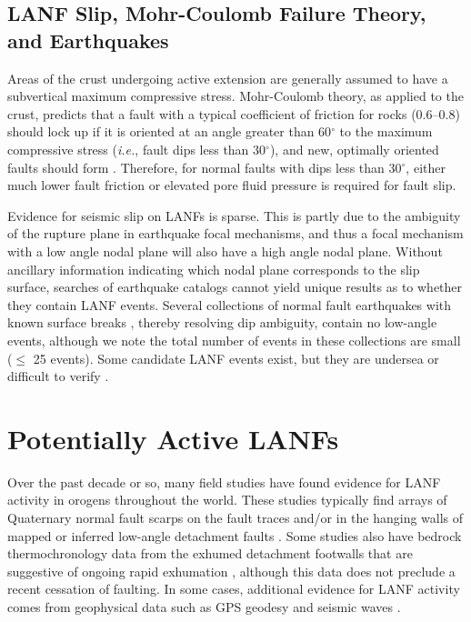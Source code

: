 \documentclass[twocolumn,grl]{AGUTeX}
\begin{document}
\begin{article}
\subsection{LANF Slip, Mohr-Coulomb Failure Theory, and Earthquakes}

Areas of the crust undergoing active extension are generally assumed
to have a subvertical maximum compressive stress.  Mohr-Coulomb
theory, as applied to the crust, predicts that a fault with a typical
coefficient of friction for rocks (0.6--0.8) should lock up if it is
oriented at an angle greater than 60$^\circ$ to the maximum compressive stress  ({\it i.e.}, fault dips less than 30$^\circ$),
and new, optimally oriented faults should form \citep{sibson1985}.  Therefore,
for normal faults with dips less than 30$^\circ$, either much lower
fault friction or elevated pore fluid pressure is required for fault slip.

Evidence for seismic slip on LANFs is sparse.  This is partly due to the
ambiguity of the rupture plane in earthquake focal mechanisms, and thus a focal
mechanism with a low angle nodal plane will also have a high angle nodal plane.
Without ancillary information indicating which nodal plane corresponds to the
slip surface, searches of earthquake catalogs cannot yield unique results as 
to whether they contain LANF events. Several collections of normal fault
earthquakes with known surface breaks \citep{jackson1987, 
collettinisibson2001}, thereby resolving dip ambiguity, contain no low-angle
events, although we note the total number of events in these collections
are small ($\le$ 25 events).  Some candidate LANF events exist, but they are
undersea \citep[e.g.,][]{abers2001} or difficult to verify \citep[e.g.,]
[]{doser1987ancash}.


\section{Potentially Active LANFs}

Over the past decade or so, many field studies have found evidence for LANF 
activity in orogens throughout the world. These studies typically find arrays of 
Quaternary normal fault scarps on the fault traces and/or in the hanging walls 
of mapped or inferred low-angle detachment faults \citep [e.g.,]
[]{axen1999baja}. Some studies also have bedrock thermochronology data from the 
exhumed detachment footwalls that are suggestive of ongoing rapid 
exhumation \citep [e.g.,][]{sundell2013lunggar}, although this data does not 
preclude a recent cessation of faulting. In some cases, additional evidence for 
LANF activity comes from geophysical data such as GPS geodesy \citep [e.g.,]
[]{hreinsdottir2009altotib} and seismic waves \citep [e.g.,][]{doser1987ancash}.


\end{article}
\end{document}
